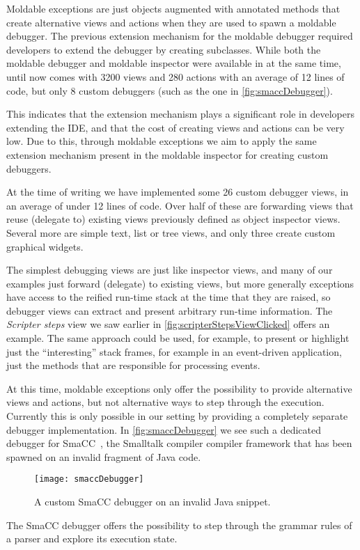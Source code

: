 \documentclass[sigplan,anonymous,review,10pt]{acmart}
\newcommand{\GT}{\lst{GT}\xspace} %
\begin{document}
Moldable exceptions are just objects augmented with annotated methods that create alternative views and actions when they are used to spawn a moldable debugger.
The previous extension mechanism for the moldable debugger required developers to extend the debugger by creating subclasses.
While both the moldable debugger and moldable inspector were available in \GT at the same time, until now \GT comes with 3200 views and 280 actions with an average of 12 lines of code, but only 8 custom debuggers (such as the one in  \autoref{fig:smaccDebugger}).

This indicates that the extension mechanism plays a significant role in developers extending the IDE, and that the cost of creating views and actions can be very low.
Due to this, through moldable exceptions we aim to apply the same extension mechanism present in the moldable inspector for creating custom debuggers.

At the time of writing we have implemented some 26 custom debugger views, in an average of under 12 lines of code.
Over half of these are forwarding views that reuse (delegate to) existing views previously defined as object inspector views.
Several more are simple text, list or tree views, and only three create custom graphical widgets.

The simplest debugging views are just like inspector views, and many of our examples just forward (delegate) to existing views, but more generally exceptions have access to the reified run-time stack at the time that they are raised, so debugger views can extract and present arbitrary run-time information.
The \emph{Scripter steps} view we saw earlier in \autoref{fig:scripterStepsViewClicked} offers an example.
The same approach could be used, for example, to present or highlight just the ``interesting'' stack frames, for example in an event-driven application, just the methods that are responsible for processing events.

At this time, moldable exceptions only offer the possibility to provide alternative views and actions, but not alternative ways to step through the execution.
Currently this is only possible in our setting by providing a completely separate debugger implementation.
In \autoref{fig:smaccDebugger} we see such a dedicated debugger for SmaCC~\cite{Brant17a}, the Smalltalk compiler compiler framework that has been spawned on an invalid fragment of Java code.
\begin{figure}[h]
  \texttt{[image: smaccDebugger]}
  \caption{A custom SmaCC debugger on an invalid Java snippet.}
  \label{fig:smaccDebugger}
\end{figure}
The SmaCC debugger offers the possibility to step through the grammar rules of a parser and explore its execution state.
\end{document}

